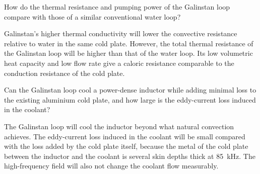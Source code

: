 \begin{description}[leftmargin=3.2em,labelwidth=2.6em,labelsep=0.6em,itemsep=4pt]
    \item[RQ1] How do the thermal resistance and pumping
    power of the Galinstan loop compare with those of a similar conventional
    water loop?
    \item[H1] Galinstan's higher thermal conductivity will lower the convective
    resistance relative to water in the same cold plate. However, the total
    thermal resistance of the Galinstan loop will be higher than that of the
    water loop. Its low volumetric heat capacity and low flow rate give a
    caloric resistance comparable to the conduction resistance of the cold
    plate.
    \item[RQ2] Can the Galinstan loop cool a power-dense inductor while adding
    minimal loss to the existing aluminium cold plate, and how large is the
    eddy-current loss induced in the coolant?
    \item[H2] The Galinstan loop will cool the inductor beyond what natural
    convection achieves. The eddy-current loss induced in the coolant will be
    small compared with the loss added by the cold plate itself, because the
    metal of the cold plate between the inductor and the coolant is several skin
    depths thick at \SI{85}{\kilo\hertz}. The high-frequency field will also not
    change the coolant flow measurably.
\end{description}
